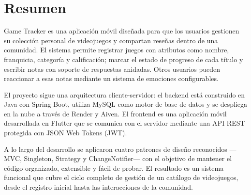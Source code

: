 
\chapter*{Resumen}

Game Tracker es una aplicación móvil diseñada para que los usuarios gestionen
su colección personal de videojuegos y compartan reseñas dentro de una
comunidad. El sistema permite registrar juegos con atributos como nombre,
franquicia, categoría y calificación; marcar el estado de progreso de cada
título y escribir notas con soporte de respuestas anidadas. Otros usuarios
pueden reaccionar a esas notas mediante un sistema de emociones configurables.

El proyecto sigue una arquitectura cliente-servidor: el backend está construido
en Java con Spring Boot, utiliza MySQL como motor de base de datos y se despliega
en la nube a través de Render y Aiven. El frontend es una aplicación móvil
desarrollada en Flutter que se comunica con el servidor mediante una API REST
protegida con JSON Web Tokens (JWT).

A lo largo del desarrollo se aplicaron cuatro patrones de diseño reconocidos
—MVC, Singleton, Strategy y ChangeNotifier— con el objetivo de mantener el
código organizado, extensible y fácil de probar. El resultado es un sistema
funcional que cubre el ciclo completo de gestión de un catálogo de videojuegos,
desde el registro inicial hasta las interacciones de la comunidad.